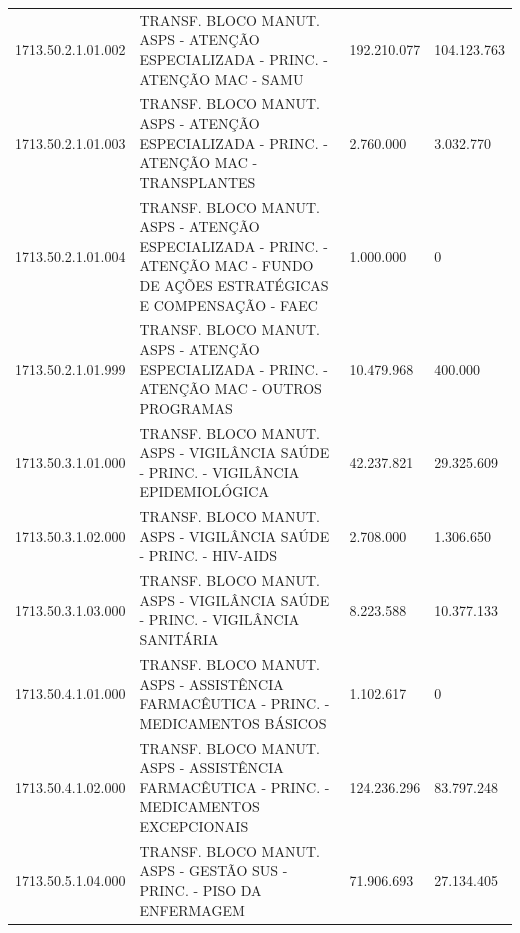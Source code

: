 \documentclass{article}
\begin{document}
\begin{longtable}[c]{m{2cm}|m{11cm}|m{2cm}m{2cm}}
\multicolumn{1}{C{2cm}|}{1713.50.2.1.01.002} & \multicolumn{1}{L{11cm}|}{TRANSF. BLOCO MANUT. ASPS - ATENÇÃO ESPECIALIZADA - PRINC. - ATENÇÃO MAC - SAMU} & \multicolumn{1}{R{2cm}|}{192.210.077} & \multicolumn{1}{R{2cm}}{104.123.763} \\
\multicolumn{1}{C{2cm}|}{1713.50.2.1.01.003} & \multicolumn{1}{L{11cm}|}{TRANSF. BLOCO MANUT. ASPS - ATENÇÃO ESPECIALIZADA - PRINC. - ATENÇÃO MAC - TRANSPLANTES} & \multicolumn{1}{R{2cm}|}{2.760.000} & \multicolumn{1}{R{2cm}}{3.032.770} \\
\multicolumn{1}{C{2cm}|}{1713.50.2.1.01.004} & \multicolumn{1}{L{11cm}|}{TRANSF. BLOCO MANUT. ASPS - ATENÇÃO ESPECIALIZADA - PRINC. - ATENÇÃO MAC - FUNDO DE AÇÕES ESTRATÉGICAS E COMPENSAÇÃO - FAEC} & \multicolumn{1}{R{2cm}|}{1.000.000} & \multicolumn{1}{R{2cm}}{            0} \\
\multicolumn{1}{C{2cm}|}{1713.50.2.1.01.999} & \multicolumn{1}{L{11cm}|}{TRANSF. BLOCO MANUT. ASPS - ATENÇÃO ESPECIALIZADA - PRINC. - ATENÇÃO MAC - OUTROS PROGRAMAS} & \multicolumn{1}{R{2cm}|}{10.479.968} & \multicolumn{1}{R{2cm}}{400.000} \\
\multicolumn{1}{C{2cm}|}{1713.50.3.1.01.000} & \multicolumn{1}{L{11cm}|}{TRANSF. BLOCO MANUT. ASPS - VIGILÂNCIA SAÚDE - PRINC. - VIGILÂNCIA EPIDEMIOLÓGICA} & \multicolumn{1}{R{2cm}|}{42.237.821} & \multicolumn{1}{R{2cm}}{29.325.609} \\
\multicolumn{1}{C{2cm}|}{1713.50.3.1.02.000} & \multicolumn{1}{L{11cm}|}{TRANSF. BLOCO MANUT. ASPS - VIGILÂNCIA SAÚDE - PRINC. - HIV-AIDS} & \multicolumn{1}{R{2cm}|}{2.708.000} & \multicolumn{1}{R{2cm}}{1.306.650} \\
\multicolumn{1}{C{2cm}|}{1713.50.3.1.03.000} & \multicolumn{1}{L{11cm}|}{TRANSF. BLOCO MANUT. ASPS - VIGILÂNCIA SAÚDE - PRINC. - VIGILÂNCIA SANITÁRIA} & \multicolumn{1}{R{2cm}|}{8.223.588} & \multicolumn{1}{R{2cm}}{10.377.133} \\
\multicolumn{1}{C{2cm}|}{1713.50.4.1.01.000} & \multicolumn{1}{L{11cm}|}{TRANSF. BLOCO MANUT. ASPS - ASSISTÊNCIA FARMACÊUTICA - PRINC. - MEDICAMENTOS BÁSICOS} & \multicolumn{1}{R{2cm}|}{1.102.617} & \multicolumn{1}{R{2cm}}{            0} \\
\multicolumn{1}{C{2cm}|}{1713.50.4.1.02.000} & \multicolumn{1}{L{11cm}|}{TRANSF. BLOCO MANUT. ASPS - ASSISTÊNCIA FARMACÊUTICA - PRINC. - MEDICAMENTOS EXCEPCIONAIS} & \multicolumn{1}{R{2cm}|}{124.236.296} & \multicolumn{1}{R{2cm}}{83.797.248} \\
\multicolumn{1}{C{2cm}|}{1713.50.5.1.04.000} & \multicolumn{1}{L{11cm}|}{TRANSF. BLOCO MANUT. ASPS - GESTÃO SUS - PRINC. - PISO DA ENFERMAGEM} & \multicolumn{1}{R{2cm}|}{71.906.693} & \multicolumn{1}{R{2cm}}{27.134.405} \\

\end{longtable}
\end{document}
